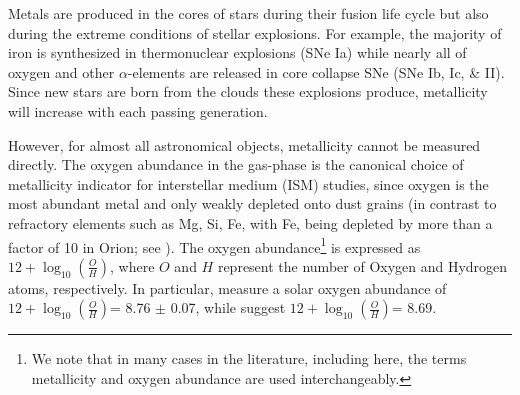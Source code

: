 \documentclass{emulateapj}
\newcommand{\oxab}{\ensuremath{12 + \log_{10}(\frac{O}{H})}}
\begin{document}
Metals are produced in the cores of stars during their fusion life cycle but also during the extreme conditions of stellar explosions. For example, the majority of iron is synthesized in thermonuclear explosions (SNe Ia) while nearly all of oxygen and other $\alpha$-elements are released in core collapse SNe (SNe Ib, Ic, \& II). Since new stars are born from the clouds these explosions produce, metallicity will increase with each passing generation. 

However, for almost all astronomical objects, metallicity cannot be measured directly. The oxygen abundance in the gas-phase is the canonical choice of metallicity indicator for interstellar medium (ISM) studies, since oxygen is the most abundant metal and only weakly depleted onto dust grains (in contrast to refractory elements such as Mg, Si, Fe, with Fe, being depleted by more than a factor of 10 in Orion; see \citealt{simondiaz11-orion}). The oxygen abundance\footnote{We note that in many cases in the literature, including here, the terms metallicity and oxygen abundance are used interchangeably.} is expressed as  \oxab, where $O$ and $H$ represent the number of Oxygen and Hydrogen atoms, respectively. In particular, \citep{chaffau11} measure a solar oxygen abundance of \oxab = 8.76 $\pm$ 0.07, while \citet{asplund09} suggest \oxab = 8.69.
\end{document}
